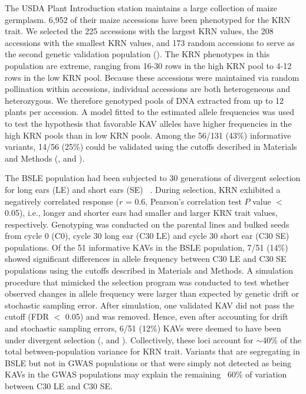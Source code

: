 \documentclass[10pt,letterpaper]{article}
\begin{document}
The USDA Plant Introduction station maintains a large collection of maize germplasm. 6,952 of their maize accessions have been phenotyped for the KRN trait. We selected the 225 accessions with the largest KRN values, the 208 accessions with the smallest KRN values, and 173 random accessions to serve as the second genetic validation population (). The KRN phenotypes in this population are extreme, ranging from 16-30 rows in the high KRN pool to 4-12 rows in the low KRN pool. Because these accessions were maintained via random pollination within accessions, individual accessions are both heterogeneous and heterozygous. We therefore genotyped pools of DNA extracted from up to 12 plants per accession. A model fitted to the estimated allele frequencies was used to test the hypothesis that favorable KAV alleles have higher frequencies in the high KRN pools than in low KRN pools. Among the 56/131 (43\%) informative variants, 14/56 (25\%) could be validated using the cutoffs described in Materials and Methods (,  and ). 

The BSLE population had been subjected to 30 generations of divergent selection for long ears (LE) and short ears (SE) ~\cite{Hallauer2004}. During selection, KRN exhibited a negatively correlated response ($r$ = 0.6, Pearson’s correlation test $P$ value $<$ 0.05), i.e., longer and shorter ears had smaller and larger KRN trait values, respectively. Genotyping was conducted on the parental lines and bulked seeds from cycle 0 (C0), cycle 30 long ear (C30 LE) and cycle 30 short ear (C30 SE) populations. Of the 51 informative KAVs in the BSLE population, 7/51 (14\%) showed significant differences in allele frequency between C30 LE and C30 SE populations using the cutoffs described in Materials and Methods. A simulation procedure that mimicked the selection program was conducted to test whether observed changes in allele frequency were larger than expected by genetic drift or stochastic sampling error. After simulation, one validated KAV did not pass the cutoff (FDR $<$ 0.05) and was removed. Hence, even after accounting for drift and stochastic sampling errors, 6/51 (12\%) KAVs were deemed to have been under divergent selection (,  and ). Collectively, these loci account for $\sim$40\% of the total between-population variance for KRN trait. Variants that are segregating in BSLE but not in GWAS populations or that were simply not detected as being KAVs in the GWAS populations may explain the remaining ~60\% of variation between C30 LE and C30 SE.
\end{document}
